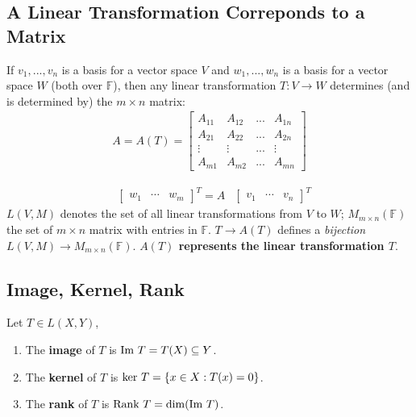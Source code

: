 \documentclass[11pt]{elegantbook}
\begin{document}
\subsection{A Linear Transformation Correponds to a Matrix}
\begin{corollary}[Corollary 2.4.16.]
    If $v_1,...,v_n$ is a basis for a vector space $V$ and $w_1,...,w_n$ is a basis for a vector space $W$ (both over $\mathbb{F}$), then any linear transformation $T : V \rightarrow W$ determines (and is determined by) the $m\times n$ matrix:
    \begin{equation}
        \begin{aligned}
            A=A(T)=\begin{bmatrix}
                A_{11}&	A_{12}&... &A_{1n}\\
                A_{21}&	A_{22}&... &A_{2n}\\
                \vdots&	\vdots&... &\vdots\\
                A_{m1}&	A_{m2}&... &A_{mn}
            \end{bmatrix}
        \end{aligned}
        \nonumber
    \end{equation}
\end{corollary}
\begin{equation}
    \begin{aligned}
        &\begin{bmatrix}
            w_1&\cdots	&w_m
        \end{bmatrix}^T=A
        &\begin{bmatrix}
                v_1&\cdots	&v_n
        \end{bmatrix}^T
    \end{aligned}
    \nonumber
\end{equation}
$L(V,M)$ denotes the set of all linear transformations from $V$ to $W$; $M_{m\times n}(\mathbb{F})$ the set of $m\times n$ matrix with entries in $\mathbb{F}$. $T\rightarrow A(T)$ defines a \textit{bijection} $L(V,M)\rightarrow M_{m\times n}(\mathbb{F})$. \textbf{$A(T)$ represents the linear transformation $T$}.




\subsection{Image, Kernel, Rank}
\begin{definition}
    \normalfont
    Let $T\in L(X,Y)$,
    \begin{enumerate}[$\circ$]
        \item The \textbf{image} of $T$ is $\textnormal{Im }T= T(X)\subseteq Y$.
        \item The \textbf{kernel} of $T$ is $\textnormal{ker }T=\{x\in X:T(x)=0\}$.
        \item The \textbf{rank} of $T$ is $\textnormal{Rank }T=\dim(\textnormal{Im }T)$.
    \end{enumerate}
\end{definition}
\end{document}
